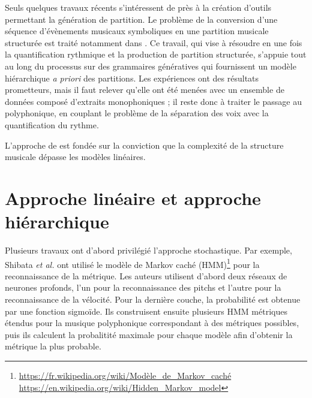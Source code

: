 Seuls quelques travaux récents s’intéressent de près à la création d’outils permettant la génération de partition. 
Le problème de la conversion d'une séquence d'évènements musicaux symboliques 
en une partition musicale structurée est traité notamment dans \cite{foscarin:hal-01988990}. 
Ce travail, qui vise à résoudre en une fois 
la quantification rythmique et la production de partition structurée, 
s’appuie tout au long du processus sur des grammaires génératives qui fournissent un modèle hiérarchique 
\textit{a priori} des partitions. 
Les expériences ont des résultats prometteurs, mais il faut relever qu’elle ont été menées avec un ensemble de données composé d'extraits monophoniques ; 
il reste donc à traiter le passage au polyphonique, 
en couplant le problème de la séparation des voix avec la quantification du rythme.

L'approche de \cite{foscarin:hal-01988990} est fondée sur la conviction 
que la complexité de la structure musicale dépasse les modèles linéaires.

\section{Approche linéaire et approche hiérarchique}
Plusieurs travaux ont d’abord privilégié l’approche stochastique. Par exemple, Shibata \textit{et al.} \cite{SHIBATA2021262} ont utilisé le modèle de Markov caché (HMM)\footnote{\url{https://fr.wikipedia.org/wiki/Modèle_de_Markov_caché}\\\url{https://en.wikipedia.org/wiki/Hidden_Markov_model}} pour la reconnaissance de la métrique. Les auteurs utilisent d’abord deux réseaux de neurones profonds, l’un pour la reconnaissance des pitchs et l’autre pour la reconnaissance de la vélocité. 
Pour la dernière couche, la probabilité est obtenue par une fonction sigmoïde. Ils construisent ensuite plusieurs HMM métriques étendus pour la musique polyphonique correspondant à des métriques possibles, puis ils calculent la probalitité maximale pour chaque modèle afin d’obtenir la métrique la plus probable.\newpage


